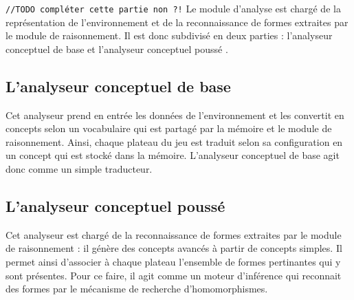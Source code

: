 \verb+//TODO compléter cette partie non ?!+
Le module d'analyse est chargé de la représentation de l'environnement et de la reconnaissance de formes extraites par le module de raisonnement. Il est donc subdivisé en deux parties : \og l'analyseur conceptuel de base \fg{} et \og l'analyseur conceptuel poussé \fg{}.
\subsection{L'analyseur conceptuel de base}\label{def:analyseur de base}
Cet analyseur prend en entrée les données de l'environnement et les convertit en concepts selon un vocabulaire qui est partagé par la mémoire et le module de raisonnement. Ainsi, chaque plateau du jeu est traduit selon sa configuration en un concept qui est stocké dans la mémoire. L'analyseur conceptuel de base agit donc comme un simple traducteur.
\subsection{L'analyseur conceptuel poussé}\label{def:analyseur pousse}
Cet analyseur est chargé de la reconnaissance de formes extraites par le module de raisonnement : il génère des concepts avancés à partir de concepts simples. Il permet ainsi d'associer à chaque plateau l'ensemble de formes pertinantes qui y sont présentes. Pour ce faire, il agit comme un moteur d'inférence qui reconnait des formes par le mécanisme de recherche d'homomorphismes.
